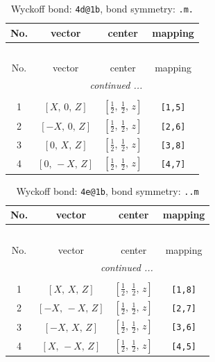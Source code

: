 \documentclass[fleqn,8pt]{jsarticle}
\begin{document}
\begin{longtable}{cccc}
\caption{Wyckoff bond: {\tt 4d@1b}, bond symmetry: {\tt .m.}}
 \\
 \hline \hline
No. & vector & center & mapping \\ \hline \endfirsthead

\multicolumn{3}{l}{\tablename\ \thetable{}} \\
 \hline \hline
No. & vector & center & mapping \\ \hline \endhead

 \hline \hline
\multicolumn{3}{r}{\footnotesize\it continued ...} \\ \endfoot

 \hline \hline
\multicolumn{3}{r}{} \\ \endlastfoot

1 & $\left[ X,\, 0,\, Z \right]$ & $\left[ \frac{1}{2},\, \frac{1}{2},\, z \right]$ & {\tt [1,5]} \\ \hline
2 & $\left[ - X,\, 0,\, Z \right]$ & $\left[ \frac{1}{2},\, \frac{1}{2},\, z \right]$ & {\tt [2,6]} \\ \hline
3 & $\left[ 0,\, X,\, Z \right]$ & $\left[ \frac{1}{2},\, \frac{1}{2},\, z \right]$ & {\tt [3,8]} \\ \hline
4 & $\left[ 0,\, - X,\, Z \right]$ & $\left[ \frac{1}{2},\, \frac{1}{2},\, z \right]$ & {\tt [4,7]} \\
\end{longtable}
\renewcommand{\arraystretch}{1.2}
\begin{longtable}{cccc}
\caption{Wyckoff bond: {\tt 4e@1b}, bond symmetry: {\tt ..m}}
 \\
 \hline \hline
No. & vector & center & mapping \\ \hline \endfirsthead

\multicolumn{3}{l}{\tablename\ \thetable{}} \\
 \hline \hline
No. & vector & center & mapping \\ \hline \endhead

 \hline \hline
\multicolumn{3}{r}{\footnotesize\it continued ...} \\ \endfoot

 \hline \hline
\multicolumn{3}{r}{} \\ \endlastfoot

1 & $\left[ X,\, X,\, Z \right]$ & $\left[ \frac{1}{2},\, \frac{1}{2},\, z \right]$ & {\tt [1,8]} \\ \hline
2 & $\left[ - X,\, - X,\, Z \right]$ & $\left[ \frac{1}{2},\, \frac{1}{2},\, z \right]$ & {\tt [2,7]} \\ \hline
3 & $\left[ - X,\, X,\, Z \right]$ & $\left[ \frac{1}{2},\, \frac{1}{2},\, z \right]$ & {\tt [3,6]} \\ \hline
4 & $\left[ X,\, - X,\, Z \right]$ & $\left[ \frac{1}{2},\, \frac{1}{2},\, z \right]$ & {\tt [4,5]} \\
\end{longtable}
\end{document}
